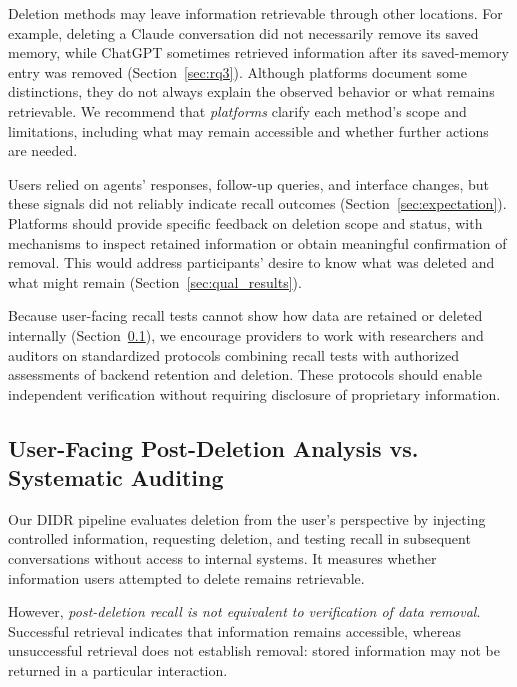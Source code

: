 %
Deletion methods may leave information retrievable through other locations. For example, deleting a Claude conversation did not necessarily remove its saved memory, while ChatGPT sometimes retrieved information after its saved-memory entry was removed (Section~\ref{sec:rq3}).
%
Although platforms document some distinctions, they do not always explain the observed behavior or what remains retrievable.
%
We recommend that \textit{platforms} clarify each method's scope and limitations, including what may remain accessible and whether further actions are needed.

%
Users relied on agents' responses, follow-up queries, and interface changes, but these signals did not reliably indicate recall outcomes (Section~\ref{sec:expectation}).
%
Platforms should provide specific feedback on deletion scope and status, with mechanisms to inspect retained information or obtain meaningful confirmation of removal.
%
This would address participants' desire to know what was deleted and what might remain (Section~\ref{sec:qual_results}).

%
Because user-facing recall tests cannot show how data are retained or deleted internally (Section~\ref{subsec:vs_audit}), we encourage providers to work with researchers and auditors on standardized protocols combining recall tests with authorized assessments of backend retention and deletion.
%
These protocols should enable independent verification without requiring disclosure of proprietary information.

\subsection{User-Facing Post-Deletion Analysis vs. Systematic Auditing}
\label{subsec:vs_audit}

Our DIDR pipeline evaluates deletion from the user's perspective by injecting controlled information, requesting deletion, and testing recall in subsequent conversations without access to internal systems. It measures whether information users attempted to delete remains retrievable.

However, \emph{post-deletion recall is not equivalent to verification of data removal}. Successful retrieval indicates that information remains accessible, whereas unsuccessful retrieval does not establish removal: stored information may not be returned in a particular interaction.

